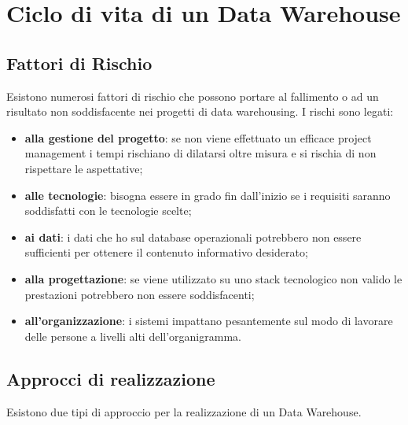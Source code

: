 \section{Ciclo di vita di un Data Warehouse}
\subsection{Fattori di Rischio}
Esistono numerosi fattori di rischio che possono portare al fallimento o ad un risultato non soddisfacente nei progetti di data warehousing. I rischi sono legati:
\begin{itemize}
	\item \textbf{alla gestione del progetto}: se non viene effettuato un efficace project management i tempi rischiano di dilatarsi oltre misura e si rischia di non rispettare le aspettative;
	\item \textbf{alle tecnologie}: bisogna essere in grado fin dall'inizio se i requisiti saranno soddisfatti con le tecnologie scelte;
	\item \textbf{ai dati}: i dati che ho sul database operazionali potrebbero non essere sufficienti per ottenere il contenuto informativo desiderato;
	\item \textbf{alla progettazione}: se viene utilizzato su uno stack tecnologico non valido le prestazioni potrebbero non essere soddisfacenti;
	\item \textbf{all'organizzazione}: i sistemi impattano pesantemente sul modo di lavorare delle persone a livelli alti dell'organigramma.
\end{itemize}
\subsection{Approcci di realizzazione}
Esistono due tipi di approccio per la realizzazione di un Data Warehouse.
